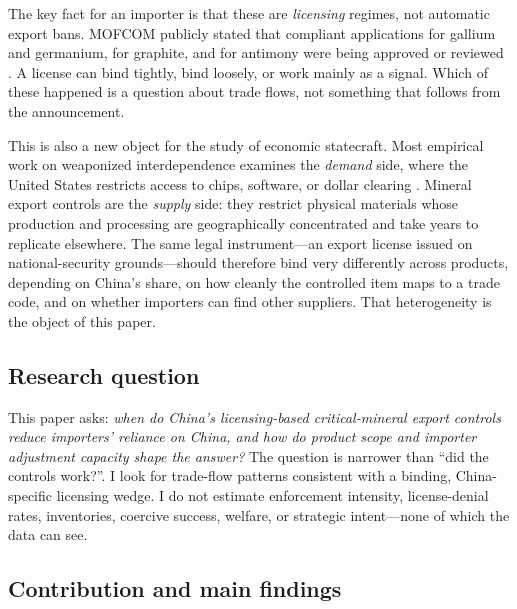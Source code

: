 \documentclass[12pt,a4paper]{article}
\begin{document}
The key fact for an importer is that these are \emph{licensing} regimes, not
automatic export bans. MOFCOM publicly stated that compliant applications for
gallium and germanium, for graphite, and for antimony were being approved or
reviewed \citep{mofcom_2023_gallium_germanium_approvals,
mofcom_2024_graphite_approvals, mofcom_2024_antimony_license_review}. A license
can bind tightly, bind loosely, or work mainly as a signal. Which of these
happened is a question about trade flows, not something that follows from the
announcement.

This is also a new object for the study of economic statecraft. Most empirical
work on weaponized interdependence examines the \emph{demand} side, where the
United States restricts access to chips, software, or dollar clearing
\citep{bown-2020-howunitedstates, bown2024semiconductors}. Mineral export
controls are the \emph{supply} side: they restrict physical materials whose
production and processing are geographically concentrated and take years to
replicate elsewhere. The same legal instrument---an export license issued on
national-security grounds---should therefore bind very differently across
products, depending on China's share, on how cleanly the controlled item maps to
a trade code, and on whether importers can find other suppliers. That
heterogeneity is the object of this paper.

\subsection{Research question}

This paper asks: \emph{when do China's licensing-based critical-mineral export
controls reduce importers' reliance on China, and how do product scope and
importer adjustment capacity shape the answer?} The question is narrower than
``did the controls work?''. I look for trade-flow patterns consistent with a
binding, China-specific licensing wedge. I do not estimate enforcement
intensity, license-denial rates, inventories, coercive success, welfare, or
strategic intent---none of which the data can see.

\subsection{Contribution and main findings}
\end{document}
